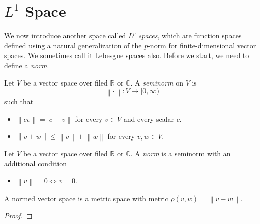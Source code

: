 \section{\(L^1\) Space}
We now introduce another space called \emph{\(L^p\) spaces}, which are function spaces defined using a natural generalization of the \hyperref[eg:p-norm]{\(p\)-norm} for finite-dimensional vector spaces. We sometimes call it Lebesgue spaces also. Before we start, we need to define a \emph{norm}.

\begin{definition}[Seminorm]\label{def:seminorm}
	Let \(V\) be a vector space over filed \(\mathbb{R} \) or \(\mathbb{C} \). A \emph{seminorm} on \(V\) is
	\[
		\left\lVert \cdot\right\rVert \colon V\to [0, \infty )
	\]
	such that
	\begin{itemize}
		\item \(\left\lVert c v\right\rVert =\left\vert c \right\vert \left\lVert v\right\rVert \) for every \(v\in V\) and every scalar \(c\).
		\item \(\left\lVert  v+w\right\rVert \leq \left\lVert v\right\rVert +\left\lVert w\right\rVert \) for every \(v, w\in V\).
	\end{itemize}
\end{definition}

\begin{definition}[Norm]\label{def:norm}
	Let \(V\) be a vector space over filed \(\mathbb{R} \) or \(\mathbb{C} \). A \emph{norm} is a \hyperref[def:seminorm]{seminorm} with an additional condition
	\begin{itemize}
		\item \(\left\lVert v\right\rVert = 0 \iff v = 0\).
	\end{itemize}
\end{definition}

\begin{lemma}
	A \hyperref[def:norm]{normed} vector space is a metric space with metric \(\rho (v, w) = \left\lVert v - w\right\rVert\).
\end{lemma}
\begin{proof}
\end{proof}

